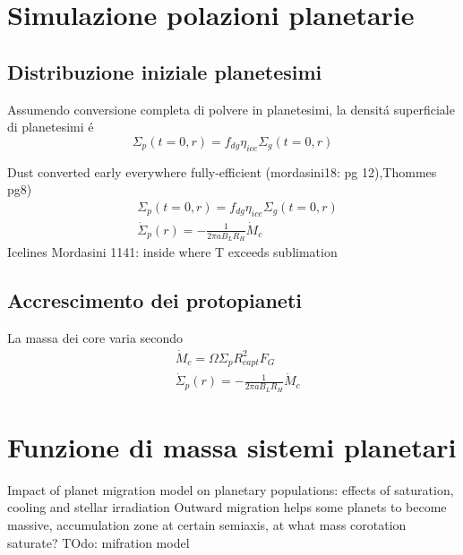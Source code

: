 {\let\clearpage\relax\let\cleardoublepage\relax
\chapter{Simulazione polazioni planetarie}
}

\section{Distribuzione iniziale planetesimi}
Assumendo conversione completa di polvere in planetesimi, la densit\'a superficiale di planetesimi \'e
\begin{equation}
\Sigma_p(t=0,r)=f_{dg}\eta_{ice}\Sigma_g(t=0,r)
\end{equation}

\begin{workout}
Dust converted early everywhere fully-efficient (mordasini18: pg 12),Thommes pg8)
\begin{align*}
&\Sigma_p(t=0,r)=f_{dg}\eta_{ice}\Sigma_g(t=0,r)\\
&\dot{\Sigma}_p(r)=-\frac{1}{2\pi aB_LR_H}\dot{M}_c
\end{align*}
Icelines Mordasini 1141: inside where T exceeds sublimation
\end{workout}

\section{Accrescimento dei protopianeti}

La massa dei core varia secondo
\begin{align}
&\dot{M}_c=\Omega\Sigma_pR^2_{capt}F_G\\
&\dot{\Sigma}_p(r)=-\frac{1}{2\pi aB_LR_H}\dot{M}_c
\end{align}

{\let\clearpage\relax\let\cleardoublepage\relax
\chapter{Funzione di massa sistemi planetari}
}

{Impact of planet migration model on planetary populations: effects of saturation, cooling and stellar irradiation}
Outward migration helps some planets to become massive, accumulation zone at certain semiaxis, at what mass corotation saturate?
TOdo: mifration model
